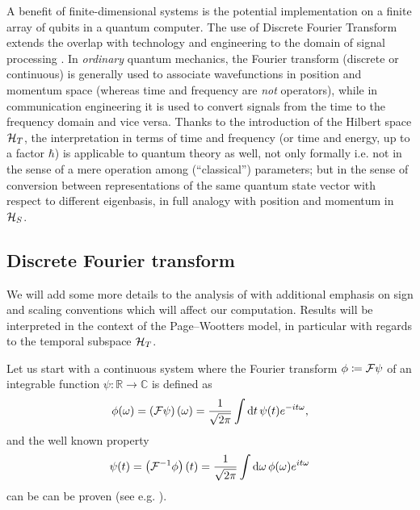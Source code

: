 A benefit of finite-dimensional systems is the potential implementation on a finite array of
qubits in a quantum computer. The use of Discrete Fourier Transform extends the overlap
with technology and engineering to the domain of signal processing \citereset\parencite{FiniteHilb}.
In \emph{ordinary} quantum mechanics, the Fourier transform (discrete or continuous)
is generally used
to associate wavefunctions in position and momentum space
(whereas time and frequency are \emph{not} operators),
while in communication engineering it is used to convert signals
from the time to the frequency domain and vice versa.
Thanks to the introduction of the Hilbert space $\mathcal{H}_T$,
the interpretation in terms of time and frequency
(or time and energy, up to a factor $\hbar$)
is applicable to quantum theory as well, not only formally
i.e. not in the sense of a mere operation among (``classical'') parameters;
but in the sense of conversion between representations of the
same quantum state vector with respect to different eigenbasis,
in full analogy with position and momentum in $\mathcal{H}_S$.

\subsection{Discrete Fourier transform}

We will add some more details to the analysis of \citereset\cite{FiniteHilb} with
additional emphasis on sign and scaling conventions which will affect
our computation. Results will be interpreted in the context of
the Page--Wootters model, in particular with regards to the temporal subspace
$\mathcal{H}_T$.

Let us start with a continuous system where the Fourier transform $\phi \coloneqq \mathcal{F}\psi$ of
an integrable function $\psi: \mathbb{R} \to \mathbb{C}$ is defined as
\begin{equation}\label{eq:fourier_transform:def}
  \phi(\omega) = \left(\mathcal{F}\psi\right) (\omega) =
    \frac{1}{\sqrt{2\pi}} \int \dd{t} \psi(t) e^{-i t \omega} \text{,}
\end{equation}
and the well known  property
\begin{equation}\label{eq:inverse_fourier_transform:def}
  \psi(t) = \left(\mathcal{F}^{-1} \phi \right) (t) =
    \frac{1}{\sqrt{2\pi}} \int \dd{\omega} \phi(\omega) e^{ i t \omega}
\end{equation}
can be can be proven (see e.g. \cite[Eq.~7.1]{Folland:Fourier}).

